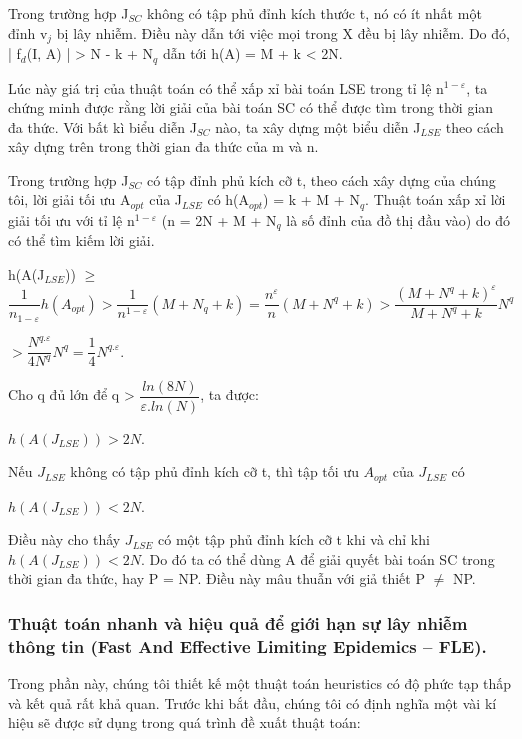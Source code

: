  		Trong trường hợp J$_{SC}$ không có tập phủ đỉnh kích thước t, nó có ít nhất một đỉnh v$_{j}$ bị lây nhiễm. Điều này dẫn tới việc mọi trong X đều bị lây nhiễm. Do đó, | f$_{d}$(I, A) | > N - k + N$_{q}$ dẫn tới h(A) = M  + k < 2N.
 		
 		Lúc này giá trị của thuật toán có thể xấp xỉ bài toán LSE trong tỉ lệ n$^{1 - \varepsilon}$, ta chứng minh được rằng lời giải của bài toán SC có thể được tìm trong thời gian đa thức. Với bất kì biểu diễn J$_{SC}$ nào, ta xây dựng một biểu diễn J$_{LSE}$ theo cách xây dựng trên trong thời gian đa thức của m và n. 
 		
 		Trong trường hợp J$_{SC}$ có tập đỉnh phủ kích cỡ t, theo cách xây dựng của chúng tôi, lời giải tối ưu A$_{opt}$ của J$_{LSE}$ có h(A$_{opt}$) = k + M + N$_{q}$. Thuật toán xấp xỉ lời giải tối ưu với tỉ lệ n$^{1 - \varepsilon}$ (n = 2N + M + N$_{q}$ là số đỉnh của đồ thị đầu vào) do đó có thể tìm kiếm lời giải. 
 		
 			h(A(J$_{LSE}$)) $\geq$ $\dfrac{1}{n_{1 - \varepsilon}} h(A_{opt}) > \dfrac{1}{n^{1 - \varepsilon}}(M + N_{q} +k) = \dfrac{n^{\varepsilon}}{n}(M + N^{q} +k) > \dfrac{(M + N^{q} + k)^{\varepsilon}}{M + N^{q} + k}N^{q}$ 
 			\begin{center}
 				$> \dfrac{N^{q.\varepsilon}}{4N^{q}}N^{q} = \dfrac{1}{4}N^{q.\varepsilon}$. 
 			\end{center}
 		
 		Cho q đủ lớn để q > $\dfrac{ln(8N)}{\varepsilon.ln(N)}$, ta được: 
 		\begin{center}
			$h(A(J_{LSE})) > 2N$.
 		\end{center}
 	
 		Nếu $J_{LSE}$ không có tập phủ đỉnh kích cỡ t, thì tập tối ưu $A_{opt}$ của $J_{LSE}$ có 
 		\begin{center}
 			$h(A(J_{LSE})) < 2N$.
 		\end{center}
 	
 		Điều này cho thấy $J_{LSE}$ có một tập phủ đỉnh kích cỡ t khi và chỉ khi $h(A(J_{LSE})) < 2N$. Do đó ta có thể dùng A để giải quyết bài toán SC trong thời gian đa thức, hay P = NP. Điều này mâu thuẫn với giả thiết P $\neq$ NP.
 		
 		\subsubsection{Thuật toán nhanh và hiệu quả để giới hạn sự lây nhiễm thông tin (Fast And Effective Limiting Epidemics – FLE).}
 		Trong phần này, chúng tôi thiết kế một thuật toán heuristics có độ phức tạp thấp và kết quả rất khả quan. Trước khi bắt đầu, chúng tôi có định nghĩa một vài kí hiệu sẽ được sử dụng trong quá trình đề xuất thuật toán:
 		
